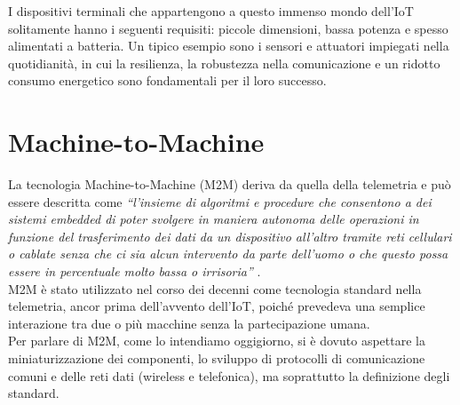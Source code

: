 \noindent I dispositivi terminali che appartengono a questo immenso mondo dell'IoT solitamente hanno i seguenti requisiti: piccole dimensioni, bassa potenza e spesso alimentati a batteria. Un tipico esempio sono i sensori e attuatori impiegati nella quotidianità, in cui la resilienza, la robustezza nella comunicazione e un ridotto consumo energetico sono fondamentali per il loro successo.



\section{Machine-to-Machine}
La tecnologia Machine-to-Machine (M2M) deriva da quella della telemetria e può essere descritta come \textit{``l'insieme di algoritmi e procedure che consentono a dei sistemi embedded di poter svolgere in maniera autonoma delle operazioni in funzione del trasferimento dei dati da un dispositivo all'altro tramite reti cellulari o cablate senza che ci sia alcun intervento da parte dell'uomo o che questo possa essere in percentuale molto bassa o irrisoria''} \cite{m2m}.\\
M2M è stato utilizzato nel corso dei decenni come tecnologia standard nella telemetria, ancor prima dell'avvento dell'IoT, poiché prevedeva una semplice interazione tra due o più macchine senza la partecipazione umana.\\
Per parlare di M2M, come lo intendiamo oggigiorno, si è dovuto aspettare la miniaturizzazione dei componenti, lo sviluppo di protocolli di comunicazione comuni e delle reti dati (wireless e telefonica), ma soprattutto la definizione degli standard.\\

